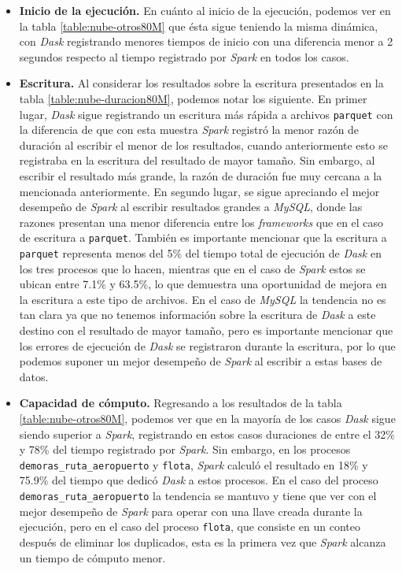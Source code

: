\begin{itemize}
	\item \textbf{Inicio de la ejecución.} En cuánto al inicio de la ejecución, podemos ver en la tabla \ref{table:nube-otros80M} que ésta sigue teniendo la misma dinámica, con \textit{Dask} registrando menores tiempos de inicio con una diferencia menor a 2 segundos respecto al tiempo registrado por \textit{Spark} en todos los casos.
	
	\item \textbf{Escritura.} Al considerar los resultados sobre la escritura presentados en la tabla \ref{table:nube-duracion80M}, podemos notar los siguiente. En primer lugar, \textit{Dask} sigue registrando un escritura más rápida a archivos \texttt{parquet} con la diferencia de que con esta muestra \textit{Spark} registró la menor razón de duración al escribir el menor de los resultados, cuando anteriormente esto se registraba en la escritura del resultado de mayor tamaño. Sin embargo, al escribir el resultado más grande, la razón de duración fue muy cercana a la mencionada anteriormente. En segundo lugar, se sigue apreciando el mejor desempeño de \textit{Spark} al escribir resultados grandes a \textit{MySQL}, donde las razones presentan una menor diferencia entre los \textit{frameworks} que en el caso de escritura a \texttt{parquet}. También es importante mencionar que la escritura a \texttt{parquet} representa menos del 5\% del tiempo total de ejecución de \textit{Dask} en los tres procesos que lo hacen, mientras que en el caso de \textit{Spark} estos se ubican entre 7.1\% y 63.5\%, lo que demuestra una oportunidad de mejora en la escritura a este tipo de archivos. En el caso de \textit{MySQL} la tendencia no es tan clara ya que no tenemos información sobre la escritura de \textit{Dask} a este destino con el resultado de mayor tamaño, pero es importante mencionar que los errores de ejecución de \textit{Dask} se registraron durante la escritura, por lo que podemos suponer un mejor desempeño de \textit{Spark} al escribir a estas bases de datos.
	
	\item \textbf{Capacidad de cómputo.} Regresando a los resultados de la tabla \ref{table:nube-otros80M}, podemos ver que en la mayoría de los casos \textit{Dask} sigue siendo superior a \textit{Spark}, registrando en estos casos duraciones de entre el 32\% y 78\% del tiempo registrado por \textit{Spark}. Sin embargo, en los procesos \texttt{demoras\_ruta\_aeropuerto} y \texttt{flota}, \textit{Spark} calculó el resultado en 18\% y 75.9\% del tiempo que dedicó \textit{Dask} a estos procesos. En el caso del proceso \texttt{demoras\_ruta\_aeropuerto} la tendencia se mantuvo y tiene que ver con el mejor desempeño de \textit{Spark} para operar con una llave creada durante la ejecución, pero en el caso del proceso \texttt{flota}, que consiste en un conteo después de eliminar los duplicados, esta es la primera vez que \textit{Spark} alcanza un tiempo de cómputo menor.
	

\end{itemize}
